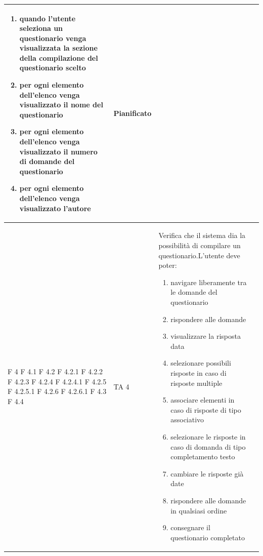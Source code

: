 \documentclass[a4paper,11pt]{article}
\begin{document}
\begin{longtable}{p{}p{}p{}p{}}
\begin{enumerate}
\item quando l'utente seleziona un questionario venga visualizzata la sezione della compilazione del questionario scelto
\item per ogni elemento dell'elenco venga visualizzato il nome del questionario
\item per ogni elemento dell'elenco venga visualizzato il numero di domande del questionario
\item per ogni elemento dell'elenco venga visualizzato l'autore
\end{enumerate} & Pianificato\\
\midrule
F 4 \newline F 4.1 \newline F 4.2 \newline F 4.2.1 \newline F 4.2.2 \newline F 4.2.3 \newline F 4.2.4 \newline F 4.2.4.1 \newline F 4.2.5 \newline F 4.2.5.1 \newline F 4.2.6 \newline F 4.2.6.1 \newline F 4.3 \newline F 4.4& TA 4& Verifica che il sistema dia la possibilità di compilare un questionario.\newline L'utente deve poter:
\begin{enumerate}
\item navigare liberamente tra le domande del questionario
\item rispondere alle domande
\item visualizzare la risposta data
\item selezionare possibili risposte in caso di risposte multiple
\item associare elementi in caso di risposte di tipo associativo
\item selezionare le risposte in caso di domanda di tipo completamento testo
\item cambiare le risposte già date
\item rispondere alle domande in qualsiasi ordine
\item consegnare il questionario completato


\end{enumerate}
\end{longtable}
\end{document}
